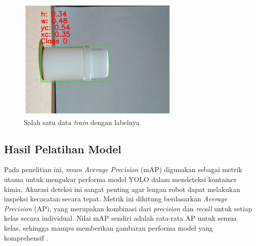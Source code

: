 \begin{figure}[H]
  \centering
  \includegraphics[width=0.7\textwidth]{gambar/anotasi.png}
  \caption{Salah satu data \textit{train} dengan labelnya}
  \label{fig:yolo-anotasi}
\end{figure}
\vspace{-1em}

\vspace{1em}

\subsection{Hasil Pelatihan Model}
Pada penelitian ini, \textit{mean Average Precision} (mAP) digunakan sebagai
metrik utama untuk mengukur performa model YOLO dalam mendeteksi
kontainer kimia. Akurasi deteksi ini sangat penting agar lengan robot
dapat melakukan inspeksi kecacatan secara tepat. Metrik ini dihitung
berdasarkan \textit{Average Precision} (AP), yang merupakan kombinasi dari
\textit{precision} dan \textit{recall} untuk setiap kelas secara
individual. Nilai mAP
sendiri adalah rata-rata AP untuk semua kelas, sehingga mampu
memberikan gambaran performa model yang komprehensif \citep{21}. \par


